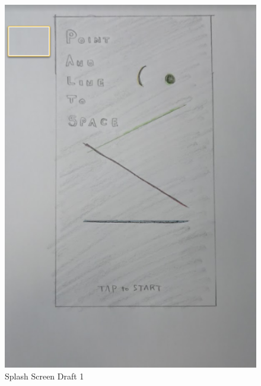 \begin{figure}[htbp]
	\centering
		\includegraphics[width=1.00\textwidth]{img/Menu4.png}
	\caption[Splash Screen Draft 1]{Splash Screen Draft 1}
	\label{fig:Menu4}
\end{figure}
